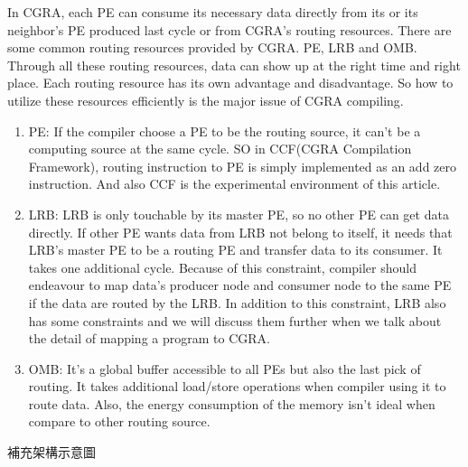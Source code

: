 In CGRA, each PE can consume its necessary data directly from its or its neighbor's PE produced last cycle or from CGRA's routing resources. There are some common routing resources provided by CGRA. PE, LRB and OMB. Through all these routing resources, data can show up at the right time and right place. Each routing resource has its own advantage and disadvantage. So how to utilize these resources efficiently is the major issue of CGRA compiling. 
\begin{enumerate} 
    \item PE: If the compiler choose a PE to be the routing source, it can't be a computing source at the same cycle. SO in CCF(CGRA Compilation Framework)\cite{CCF}, routing instruction to PE is simply implemented as an add zero instruction. And also CCF is the experimental environment of this article.
    \item LRB: LRB is only touchable by its master PE, so no other PE can get data directly. If other PE wants data from LRB not belong to itself, it needs that LRB's master PE to be a routing PE and transfer data to its consumer. It takes one additional cycle. Because of this constraint, compiler should endeavour to map data's producer node and consumer node to the same PE if the data are routed by the LRB. In addition to this constraint, LRB also has some constraints and we will discuss them further when we talk about the detail of mapping a program to CGRA.
    \item OMB: It's a global buffer accessible to all PEs but also the last pick of routing. It takes additional load/store operations when compiler using it to route data. Also, the energy consumption of the memory isn't ideal when compare to other routing source.
\end{enumerate}

補充架構示意圖


